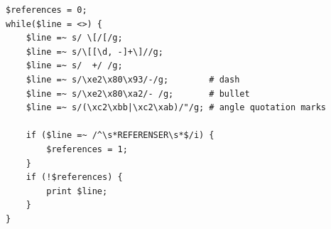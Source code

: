 \documentclass[a4paper]{report}
\begin{document}
\begin{appendices}
\begin{Code}
\begin{lstlisting}[frame=single]
$references = 0;
while($line = <>) {
    $line =~ s/ \[/[/g;
    $line =~ s/\[[\d, -]+\]//g;
    $line =~ s/  +/ /g;
    $line =~ s/\xe2\x80\x93/-/g;        # dash
    $line =~ s/\xe2\x80\xa2/- /g;       # bullet
    $line =~ s/(\xc2\xbb|\xc2\xab)/"/g; # angle quotation marks

    if ($line =~ /^\s*REFERENSER\s*$/i) {
        $references = 1;
    }
    if (!$references) {
        print $line;
    }
}
\end{lstlisting}
\end{Code}

\end{appendices}

\clearpage



\end{document}
